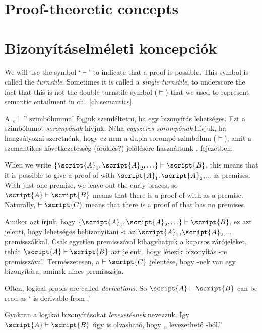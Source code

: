 

\section*{Proof-theoretic concepts}
\section{Bizonyításelméleti koncepciók}

We will use the symbol `$\vdash$' to indicate that a proof is possible. This symbol is called the \emph{turnstile}. Sometimes it is called a \emph{single turnstile}, to underscore the fact that this is not the {double turnstile} symbol ($\models$) that we used to represent semantic entailment in ch.~\ref{ch.semantics}.

A „$\vdash$” szimbólummal fogjuk szemléltetni, ha egy bizonyítás lehetséges. Ezt a szimbólumot \emph{sorompónak} hívjuk. Néha \emph{egyszeres sorompónak} hívjuk, ha hangsúlyozni szeretnénk, hogy ez nem a {dupla sorompó} szimbólum ($\models$), amit a szemantikus következetesség (öröklés?) jelölésére használtunk . fejezetben.

When we write $\{\script{A}_1,\script{A}_2,\ldots\}\vdash\script{B}$, this means that it is possible to give a proof of  with $\script{A}_1$,$\script{A}_2$,$\ldots$ as premises. With just one premise, we leave out the curly braces, so $\script{A}\vdash\script{B}$ means that there is a proof of  with  as a premise. Naturally, $\vdash\script{C}$ means that there is a proof of  that has no premises.

Amikor azt írjuk, hogy $\{\script{A}_1,\script{A}_2,\ldots\}\vdash\script{B}$, ez azt jelenti, hogy lehetséges bebizonyítani  -t az $\script{A}_1$,$\script{A}_2$,$\ldots$ premisszákkal. Csak egyetlen premisszával kihagyhatjuk a kapcsos zárójeleket, tehát $\script{A}\vdash\script{B}$ azt jelenti, hogy létezik bizonyítás -re  premisszával. Természetesen, a $\vdash\script{C}$ jelentése, hogy -nek van egy bizonyítása, aminek nincs premisszája.

Often, logical proofs are called \emph{derivations}. So $\script{A}\vdash\script{B}$ can be read as ` is derivable from .'

Gyakran a logikai bizonyításokat \emph{levezetésnek} nevezzük. Így $\script{A}\vdash\script{B}$ úgy is olvasható, hogy „ levezethető -ból.”

